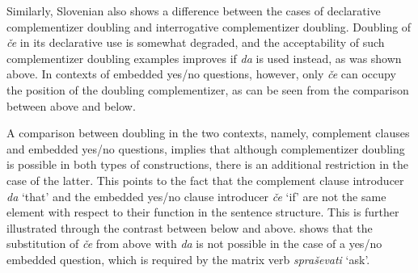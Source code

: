 \documentclass[output=paper,
]{langscibook}
\begin{document}
Similarly, Slovenian also shows a difference between the cases of declarative complementizer doubling and interrogative complementizer doubling. Doubling of \textit{če} in its declarative use is somewhat degraded, and the acceptability of such complementizer doubling examples improves if \textit{da} is used instead, as was shown above. In contexts of embedded yes/no questions, however, only \textit{če} can occupy the position of the doubling complementizer, as can be seen from the comparison between  above and  below.


\begin{exe} 
\end{exe}

\noindent A comparison between doubling in the two contexts, namely, complement clauses and embedded yes/no questions, implies that although complementizer doubling is possible in both types of constructions, there is an additional restriction in the case of the latter. This points to the fact that the complement clause introducer \textit{da} `that' and the embedded yes/no clause introducer \textit{če} `if' are not the same element with respect to their function in the sentence structure. This is further illustrated through the contrast between  below and  above.  shows that the substitution of \textit{če} from  above with \textit{da} is not possible in the case of a yes/no embedded question, which is required by the matrix verb \textit{spraševati} `ask'.

\begin{exe} 
\end{exe}
\end{document}

